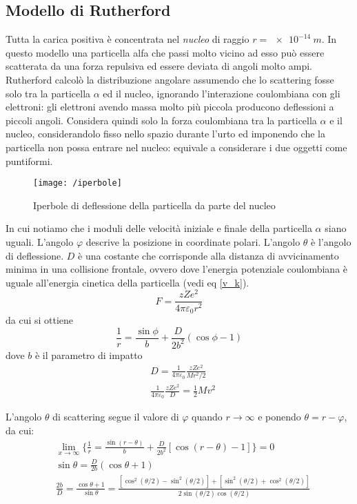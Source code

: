 \subsection{Modello di Rutherford}
Tutta la carica positiva è concentrata nel \textit{nucleo} di raggio $r = \SI{e-14}{m}$.
In questo modello una particella alfa che passi molto vicino ad esso può essere scatterata da una forza repulsiva ed essere deviata di angoli molto ampi.
Rutherford calcolò la distribuzione angolare assumendo che lo scattering fosse solo tra la particella $\alpha$ ed il nucleo, ignorando l'interazione coulombiana con gli elettroni: gli elettroni avendo massa molto più piccola producono deflessioni a piccoli angoli.
Considera quindi solo la forza coulombiana tra la particella $\alpha$ e il nucleo, considerandolo fisso nello spazio durante l'urto ed imponendo che la particella non possa entrare nel nucleo: equivale a considerare i due oggetti come puntiformi.
\begin{figure}[h]
\centering
\texttt{[image: /iperbole]}
\caption{Iperbole di deflessione della particella da parte del nucleo}
\end{figure}
In cui notiamo che i moduli delle velocità iniziale e finale della particella $\alpha$ siano uguali.
L'angolo $\varphi$ descrive la posizione in coordinate polari.
L'angolo $\theta$ è l'angolo di deflessione.
$D$ è una costante che corrisponde alla distanza di avvicinamento minima in una collisione frontale, ovvero dove l'energia potenziale coulombiana è uguale all'energia cinetica della particella (vedi eq \ref{v_k}).
\begin{equation}
F = \frac{z Z e^2}{4\pi \varepsilon_0 r^2}
\end{equation}
da cui si ottiene
\begin{equation}
\frac{1}{r} = \frac{\sin \phi}{b} + \frac{D}{2 b^2} ( \cos \phi - 1 )
\end{equation}
dove $b$ è il parametro di impatto
\begin{equation}
\begin{split}
& D = \frac{1}{4\pi \varepsilon_0} \frac{z Z e^2}{M r^2/2} \\
& \frac{1}{4\pi \varepsilon_0} \frac{z Z e^2}{D} = \frac{ 1}{2 } M v^2
\end{split}
\label{v_k}
\end{equation}

L'angolo $\theta$ di scattering segue il valore di $\varphi$ quando $r \rightarrow \infty $ e ponendo $\theta = r - \varphi $, da cui:
\begin{equation}
\begin{split}
& \lim_{x\to\infty} \bigg\{  \frac{1}{r} = \frac{\sin(r - \theta)}{b} + \frac{D}{2 b^2} [ \cos (r - \theta) - 1 ] \bigg\} = 0 \\
& \sin \theta = \frac{D}{2 b} (\cos \theta + 1) \\
& \frac{2 b }{D} = \frac{\cos \theta + 1}{\sin \theta} = \frac{ [\cos^2 (\theta /2) - \sin^2 (\theta /2) ] + [ \sin^2(\theta /2) + \cos^2(\theta /2) ] }{  2 \sin(\theta /2) \cos(\theta /2)  }
\end{split}
\end{equation}

